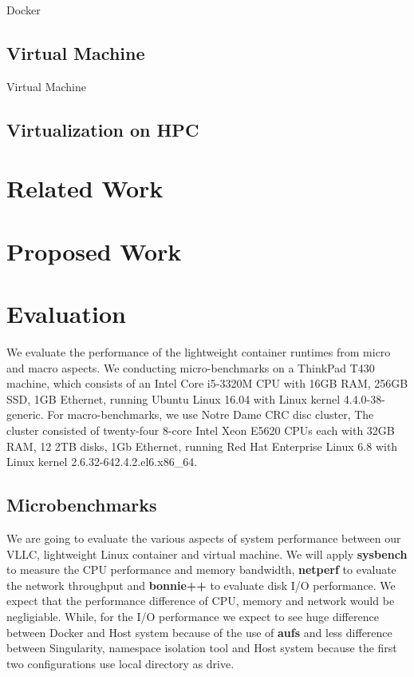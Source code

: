 \documentclass{article}
\begin{document}
Docker\cite{dockerwb}

\subsection{Virtual Machine}

Virtual Machine\cite{rosenblum2005virtual}

\subsection{Virtualization on HPC}

\section{Related Work}

\section{Proposed Work}

\section{Evaluation}

We evaluate the performance of the lightweight container runtimes from micro and macro aspects. We conducting 
micro-benchmarks on a ThinkPad T430 machine, which consists of an Intel Core i5-3320M CPU with 16GB RAM, 256GB
SSD, 1GB Ethernet, running Ubuntu Linux 16.04 with Linux kernel 4.4.0-38-generic. For macro-benchmarks, we use
Notre Dame CRC disc cluster, The cluster consisted of twenty-four 8-core Intel Xeon E5620 CPUs each with 32GB
RAM, 12 2TB disks, 1Gb Ethernet, running Red Hat Enterprise Linux 6.8 with Linux kernel 2.6.32-642.4.2.el6.x86\_64.

\subsection{Microbenchmarks}

We are going to evaluate the various aspects of system performance between our VLLC, 
lightweight Linux container and virtual machine. We will apply \textbf{sysbench} to measure the CPU 
performance and memory bandwidth, \textbf{netperf} to evaluate the network throughput and \textbf{bonnie++} 
to evaluate disk I/O performance. We expect that the performance difference of CPU, memory and network would 
be negligiable. While, for the I/O performance we expect to see huge difference between Docker and Host 
system because of the use of \textbf{aufs} and less difference between Singularity, namespace isolation tool and
Host system because the first two configurations use local directory as drive.
\end{document}
